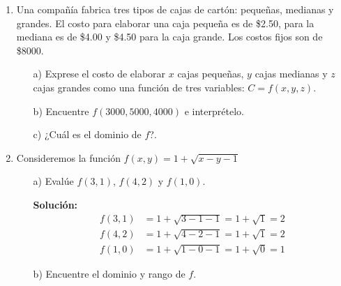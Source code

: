 \documentclass[12pt,legalpaper]{report}
\begin{document}
\begin{enumerate}


\item Una compañía fabrica tres tipos de cajas de cartón: pequeñas, medianas y grandes. El costo para elaborar una caja pequeña es de \$2.50, para la mediana es de \$4.00 y \$4.50 para la caja grande. Los costos fijos son de \$8000.
\begin{enumerate}
  \item[a)] Exprese el costo de elaborar $x$ cajas pequeñas, $y$ cajas medianas y $z$ cajas grandes como una función de tres
    variables: $C=f(x, y, z)$.
  \item[{\color{blue}b)}] Encuentre $f (3000, 5000, 4000)$ e interprételo.
  \item[c)] ¿Cuál es el dominio de $f$?.
\end{enumerate}

\item Consideremos la función $f(x,y)=1+\sqrt{x-y-1}$
\begin{enumerate}
  \item[{\color{blue}a)}] Evalúe $f(3,1)$, $f(4,2)$ y $f(1,0)$.
  
    \textbf{Solución: }
    \begin{align*}
      f(3,1) &= 1+\sqrt{3-1-1} = 1+\sqrt{1} = 2\\
      f(4,2) &= 1+\sqrt{4-2-1} = 1+\sqrt{1} = 2\\
      f(1,0) &= 1+\sqrt{1-0-1} = 1+\sqrt{0} = 1
    \end{align*}
  \item[b)] Encuentre el dominio y rango de $f$.
\end{enumerate}




\end{enumerate}
\end{document}
